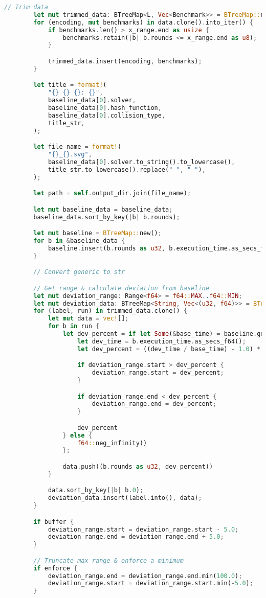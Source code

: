 \begin{lstlisting}[language=rust, caption={graphing/graphs.rs}]
		// Trim data
		let mut trimmed_data: BTreeMap<L, Vec<Benchmark>> = BTreeMap::new();
		for (encoding, mut benchmarks) in data.clone().into_iter() {
			if benchmarks.len() > x_range.end as usize {
				benchmarks.retain(|b| b.rounds <= x_range.end as u8);
			}

			trimmed_data.insert(encoding, benchmarks);
		}

		let title = format!(
			"{} {} {}: {}",
			baseline_data[0].solver,
			baseline_data[0].hash_function,
			baseline_data[0].collision_type,
			title_str,
		);

		let file_name = format!(
			"{}_{}.svg",
			baseline_data[0].solver.to_string().to_lowercase(),
			title_str.to_lowercase().replace(" ", "_"),
		);

		let path = self.output_dir.join(file_name);

		let mut baseline_data = baseline_data;
		baseline_data.sort_by_key(|b| b.rounds);

		let mut baseline = BTreeMap::new();
		for b in &baseline_data {
			baseline.insert(b.rounds as u32, b.execution_time.as_secs_f64());
		}

		// Convert generic to str

		// Get range & calculate deviation from baseline
		let mut deviation_range: Range<f64> = f64::MAX..f64::MIN;
		let mut deviation_data: BTreeMap<String, Vec<(u32, f64)>> = BTreeMap::new();
		for (label, run) in trimmed_data.clone() {
			let mut data = vec![];
			for b in run {
				let dev_percent = if let Some(&base_time) = baseline.get(&(b.rounds as u32)) {
					let dev_time = b.execution_time.as_secs_f64();
					let dev_percent = ((dev_time / base_time) - 1.0) * 100.0;

					if deviation_range.start > dev_percent {
						deviation_range.start = dev_percent;
					}

					if deviation_range.end < dev_percent {
						deviation_range.end = dev_percent;
					}

					dev_percent
				} else {
					f64::neg_infinity()
				};

				data.push((b.rounds as u32, dev_percent))
			}

			data.sort_by_key(|b| b.0);
			deviation_data.insert(label.into(), data);
		}

		if buffer {
			deviation_range.start = deviation_range.start - 5.0;
			deviation_range.end = deviation_range.end + 5.0;
		}

		// Truncate max range & enforce a minimum
		if enforce {
			deviation_range.end = deviation_range.end.min(100.0);
			deviation_range.start = deviation_range.start.min(-5.0);
		}


\end{lstlisting}
